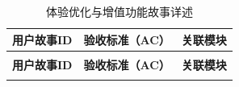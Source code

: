 \begin{levellist}
\begin{levellist}
        \begin{longtable}{>{\centering\arraybackslash}m{2.3cm} >{\centering\arraybackslash}m{7.5cm} >{\centering\arraybackslash}m{4cm}}

            \caption{体验优化与增值功能故事详述} \label{tab:training}                                                                                                                                                                                                                            \\

            \toprule
            \textbf{用户故事ID} & \textbf{验收标准（AC）}                                                                                                                                               & \textbf{关联模块}                                                                       \\
            \midrule
            \endfirsthead

            \multicolumn{3}{c}{{\tablename\ \thetable{} 续表}}                                                                                                                                                                                                                        \\
            \toprule
            \textbf{用户故事ID} & \textbf{验收标准（AC）}                                                                                                                                               & \textbf{关联模块}                                                                       \\
            \midrule
            \endhead

            \bottomrule
            \endfoot


\end{longtable}
\end{levellist}
\end{levellist}
